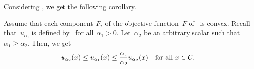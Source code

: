 \documentclass[../main]{subfiles}
\begin{document}
Considering , we get the following corollary.
\begin{corollary}
    Assume that each component~$F_i$ of the objective function~$F$ of~ is convex.
    Recall that~$u_{\alpha_1}$ is defined by~ for all~$\alpha_1 > 0$.
    Let~$\alpha_2$ be an arbitrary scalar such that $\alpha_1 \ge \alpha_2$.
    Then, we get
    \begin{equation}
        u_{\alpha_2}(x) \le u_{\alpha_1}(x) \le \frac{\alpha_1}{\alpha_2} u_{\alpha_2}(x) \quad \text{for all~$x \in C$}
        .\end{equation}
\end{corollary}
\end{document}
